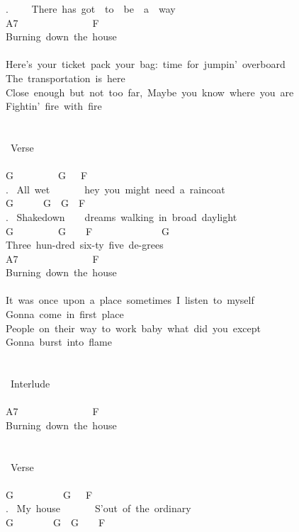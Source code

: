 {. \ \ \ \ There\ has\ got\ \ to\ \ be\ \ a\ \ way\\
A7\ \ \ \ \ \ \ \ \ \ \ \ \ \ \ F\\
Burning\ down\ the\ house\\
\\
Here's\ your\ ticket\ pack\ your\ bag:\ time\ for\ jumpin'\ overboard\\
The\ transportation\ is\ here\\
Close\ enough\ but\ not\ too\ far,\ Maybe\ you\ know\ where\ you\ are\\
Fightin'\ fire\ with\ fire\\
\\
\\
\lbrack\ Verse\rbrack\\
\\
G\ \ \ \ \ \ \ \ \ G\ \ \ F\\
. \ All\ wet\ \ \ \ \ \ \ hey\ you\ might\ need\ a\ raincoat\\
G\ \ \ \ \ \ G\ \ G\ \ F\\
. \ Shakedown\ \ \ \ dreams\ walking\ in\ broad\ daylight\\
G\ \ \ \ \ \ \ \ \ G\ \ \ \ F\ \ \ \ \ \ \ \ \ \ \ \ \ \ G\\
Three\ hun-dred\ six-ty\ five\ de-grees\\
A7\ \ \ \ \ \ \ \ \ \ \ \ \ \ \ F\\
Burning\ down\ the\ house\\
\\
It\ was\ once\ upon\ a\ place\ sometimes\ I\ listen\ to\ myself\\
Gonna\ come\ in\ first\ place\\
People\ on\ their\ way\ to\ work\ baby\ what\ did\ you\ except\\
Gonna\ burst\ into\ flame\\
\\
\\
\lbrack\ Interlude\rbrack\\
\\
A7\ \ \ \ \ \ \ \ \ \ \ \ \ \ \ F\\
Burning\ down\ the\ house\\
\\
\\
\lbrack\ Verse\rbrack\\
\\
G\ \ \ \ \ \ \ \ \ \ G\ \ \ F\\
. \ My\ house\ \ \ \ \ \ \ S'out\ of\ the\ ordinary\\
G\ \ \ \ \ \ \ \ G\ \ G\ \ \ \ F\\
}
